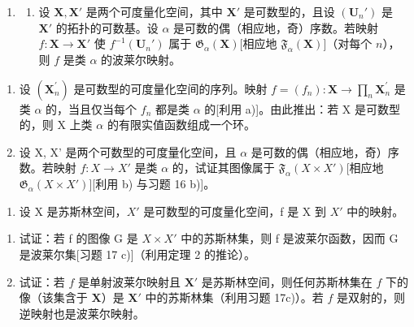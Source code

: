 \begin{enumerate}
\def\labelenumi{\arabic{enumi})}
\setcounter{enumi}{16}
\tightlist
\item
  \begin{enumerate}
  \def\labelenumii{\alph{enumii})}
  \tightlist
  \item
    设 \(\mathbf{X}, \mathbf{X}'\) 是两个可度量化空间，其中 \(\mathbf{X}'\) 是可数型的，且设 \((\mathbf{U}_n')\) 是 \(\mathbf{X}'\) 的拓扑的可数基。设 \(\alpha\) 是可数的偶（相应地，奇）序数。若映射 \(f: \mathbf{X} \to \mathbf{X}'\) 使 \(f^{-1}(\mathbf{U}_n')\) 属于 \(\mathfrak{G}_{\alpha}(\mathbf{X})\){[}相应地 \(\mathfrak{F}_{\alpha}(\mathbf{X})\){]}（对每个 \(n\)），则 \(f\) 是类 \(\alpha\) 的波莱尔映射。
  \end{enumerate}
\end{enumerate}

\begin{enumerate}
\def\labelenumi{\alph{enumi})}
\setcounter{enumi}{1}
\item
  设 \((\mathbf{X}_{n}^{\prime})\) 是可数型的可度量化空间的序列。映射 \(f = (f_{n}) : \mathbf{X} \to \prod_{n} \mathbf{X}_{n}^{\prime}\) 是类 \(\alpha\) 的，当且仅当每个 \(f_{n}\) 都是类 \(\alpha\) 的{[}利用 a){]}。由此推出：若 X 是可数型的，则 X 上类 \(\alpha\) 的有限实值函数组成一个环。
\item
  设 X, X' 是两个可数型的可度量化空间，且 \(\alpha\) 是可数的偶（相应地，奇）序数。若映射 \(f: X \to X'\) 是类 \(\alpha\) 的，试证其图像属于 \(\mathfrak{F}_{\alpha}(X \times X')\){[}相应地 \(\mathfrak{G}_{\alpha}(X \times X')\){]}{[}利用 b) 与习题 16 b){]}。
\end{enumerate}

\begin{enumerate}
\def\labelenumi{\arabic{enumi})}
\setcounter{enumi}{17}
\tightlist
\item
  设 X 是苏斯林空间，\(X'\) 是可数型的可度量化空间，f 是 X 到 \(X'\) 中的映射。
\end{enumerate}

\begin{enumerate}
\def\labelenumi{\alph{enumi})}
\item
  试证：若 f 的图像 G 是 \(X \times X'\) 中的苏斯林集，则 f 是波莱尔函数，因而 G 是波莱尔集{[}习题 17 c){]}（利用定理 2 的推论）。
\item
  试证：若 \(f\) 是单射波莱尔映射且 \(\mathbf{X}'\) 是苏斯林空间，则任何苏斯林集在 \(f\) 下的像（该集含于 \(\mathbf{X}\)）是 \(\mathbf{X}'\) 中的苏斯林集（利用习题 17c)）。若 \(f\) 是双射的，则逆映射也是波莱尔映射。
\end{enumerate}

